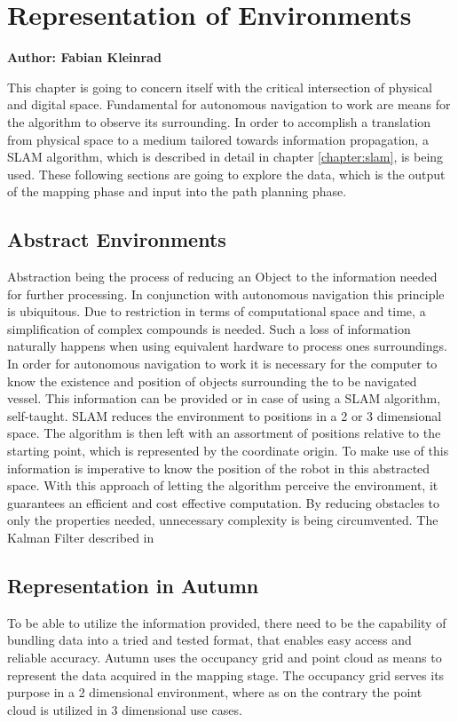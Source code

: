 \chapter{Representation of Environments}
\label{chapter:abstract_env}

\textbf{Author: Fabian Kleinrad} 

This chapter is going to concern itself with the critical intersection of physical and digital space. Fundamental for autonomous navigation to work are means for the algorithm to observe its surrounding. In order to accomplish a translation from physical space to a medium tailored towards information propagation, a SLAM algorithm, which is described in detail in chapter \ref{chapter:slam}, is being used. These following sections are going to explore the data, which is the output of the mapping phase and input into the path planning phase.

\section{Abstract Environments}

Abstraction being the process of reducing an Object to the information needed for further processing. In conjunction with autonomous navigation this principle is ubiquitous. Due to restriction in terms of computational space and time, a simplification of complex compounds is needed. Such a loss of information naturally happens when using equivalent hardware to process ones surroundings.\newline
In order for autonomous navigation to work it is necessary for the computer to know the existence and position of objects surrounding the to be navigated vessel. This information can be provided or in case of using a SLAM algorithm, self-taught. SLAM reduces the environment to positions in a 2 or 3 dimensional space. The algorithm is then left with an assortment of positions relative to the starting point, which is represented by the coordinate origin. To make use of this information is imperative to know the position of the robot in this abstracted space.\newline
With this approach of letting the algorithm perceive the environment, it guarantees an efficient and cost effective computation. By reducing obstacles to only the properties needed, unnecessary complexity is being circumvented.      
The Kalman Filter described in 

\section{Representation in Autumn}
To be able to utilize the information provided, there need to be the capability of bundling data into a tried and tested format, that enables easy access and reliable accuracy.\newline
Autumn uses the occupancy grid and point cloud as means to represent the data acquired in the mapping stage. The occupancy grid serves its purpose in a 2 dimensional environment, where as on the contrary the point cloud is utilized in 3 dimensional use cases.

